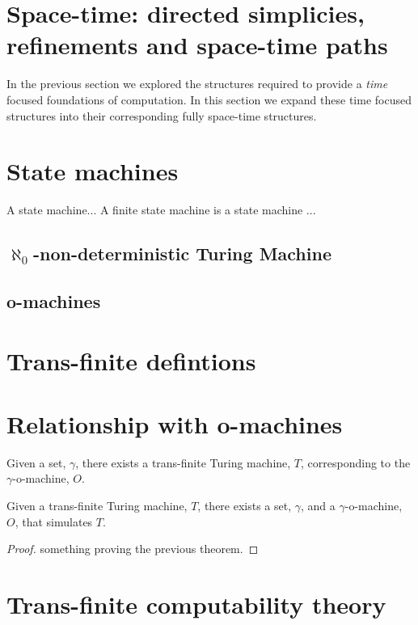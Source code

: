 \documentclass[a4paper]{amsart}
\begin{document}
\section{Space-time: directed simplicies, refinements and space-time paths}

In the previous section we explored the structures required to provide a \emph{time} focused 
foundations of computation. In this section we expand these time focused structures into 
their corresponding fully space-time structures.

\section{State machines}

\begin{definition}

A state machine... A finite state machine is a state machine ...

\end{definition}

\subsection{$\aleph_0$-non-deterministic Turing Machine}

\subsection{o-machines}

\section{Trans-finite defintions}

\section{Relationship with o-machines}

\begin{theorem}

Given a set, $\gamma$, there exists a trans-finite Turing machine, $T$, corresponding to
the $\gamma$-o-machine, $O$.

\end{theorem}


\begin{theorem}

Given a trans-finite Turing machine, $T$, there exists a set, $\gamma$, and a
$\gamma$-o-machine, $O$, that simulates $T$.

\end{theorem}

\begin{proof}
something proving the previous theorem.
\end{proof}

\section{Trans-finite computability theory}




\end{document}

